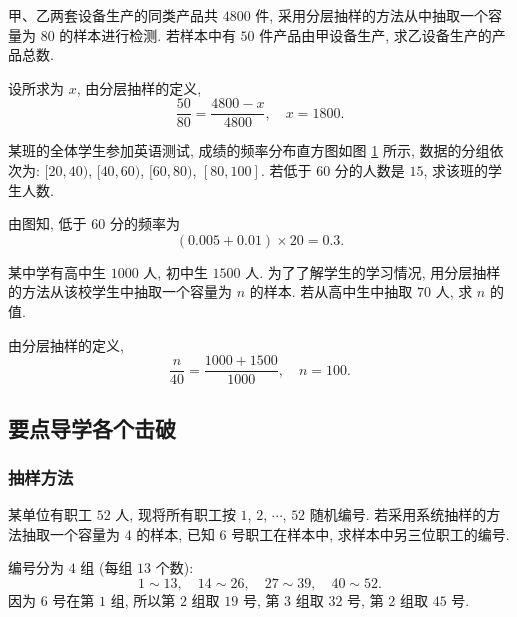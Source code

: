 \begin{exercise}
    甲、乙两套设备生产的同类产品共 $4800$ 件, 采用分层抽样的方法从中抽取一个容量为 $80$ 的样本进行检测. 若样本中有 $50$ 件产品由甲设备生产, 求乙设备生产的产品总数.
\end{exercise}
\beginsolution
    设所求为 $x$, 由分层抽样的定义,
    \[\frac{50}{80}= \frac{4800-x}{4800},\quad x= 1800.\]
\endsolution

\begin{exercise}
    某班的全体学生参加英语测试, 成绩的频率分布直方图如图 \ref{fig-190629-1630} 所示, 数据的分组依次为: $[20, 40)$, $[40, 60)$, $[60, 80)$, $[80, 100]$. 若低于 $60$ 分的人数是 $15$, 求该班的学生人数.
    \begin{figure}[htb]
        \small
        \centering
       \caption{}\label{fig-190629-1630}
    \end{figure}
\end{exercise}
\beginsolution
    由图知, 低于 $60$ 分的频率为
    \[(0.005+ 0.01)\times 20= 0.3.\]
\endsolution
    
\begin{exercise}
    某中学有高中生 $1000$ 人, 初中生 $1500$ 人. 为了了解学生的学习情况, 用分层抽样的方法从该校学生中抽取一个容量为 $n$ 的样本. 若从高中生中抽取 $70$ 人, 求 $n$ 的值.
\end{exercise}
\beginsolution
    由分层抽样的定义,
    \[\frac{n}{40}= \frac{1000+1500}{1000},\quad n=100.\]
\endsolution

\subsection{要点导学\quad 各个击破}
\subsubsection{抽样方法}
\begin{example}
    某单位有职工 $52$ 人, 现将所有职工按 $1$, $2$, $\cdots$, $52$ 随机编号. 若采用系统抽样的方法抽取一个容量为 $4$ 的样本, 已知 $6$ 号职工在样本中, 求样本中另三位职工的编号.
\end{example}
\beginsolution
    编号分为 $4$ 组 (每组 $13$ 个数):
    \[1\sim 13,\quad 14\sim 26,\quad 
    27\sim 39,\quad 40\sim 52.\]
    因为 $6$ 号在第 $1$ 组, 所以第 $2$ 组取 $19$ 号, 第 $3$ 组取 $32$ 号, 第 $2$ 组取 $45$ 号.
\endsolution

